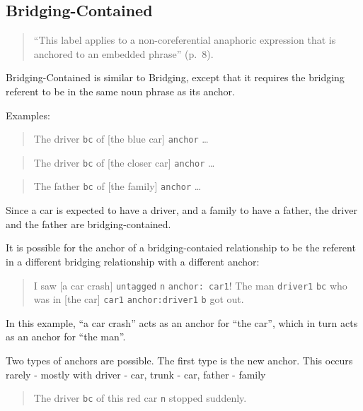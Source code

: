 \documentclass[
]{book}
\begin{document}
\hypertarget{bridging-contained}{%
\subsection{Bridging-Contained}\label{bridging-contained}}

\begin{quote}
``This label applies to a non-coreferential anaphoric expression that is anchored to an embedded phrase'' (p.~8).
\end{quote}

Bridging-Contained is similar to Bridging, except that it requires the bridging referent to be in the same noun phrase as its anchor.

Examples:

\begin{quote}
The driver \texttt{bc} of {[}the blue car{]} \texttt{anchor} \ldots{}
\end{quote}

\begin{quote}
The driver \texttt{bc} of {[}the closer car{]} \texttt{anchor} \ldots{}
\end{quote}

\begin{quote}
The father \texttt{bc} of {[}the family{]} \texttt{anchor} \ldots{}
\end{quote}

Since a car is expected to have a driver, and a family to have a father,
the driver and the father are bridging-contained.

It is possible for the anchor of a bridging-contaied relationship to be the referent in a different bridging relationship
with a different anchor:

\begin{quote}
I saw {[}a car crash{]} \texttt{untagged} \texttt{n} \texttt{anchor:\ car1}!
The man \texttt{driver1} \texttt{bc} who was in {[}the car{]} \texttt{car1} \texttt{anchor:driver1} \texttt{b} got out.
\end{quote}

In this example, ``a car crash'' acts as an anchor for ``the car'',
which in turn acts as an anchor for ``the man''.

Two types of anchors are possible.
The first type is the new anchor. This occurs rarely - mostly with driver - car, trunk - car, father - family

\begin{quote}
The driver \texttt{bc} of this red car \texttt{n} stopped suddenly.
\end{quote}
\end{document}
